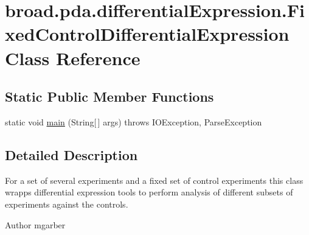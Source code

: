 \hypertarget{classbroad_1_1pda_1_1differential_expression_1_1_fixed_control_differential_expression}{\section{broad.\+pda.\+differential\+Expression.\+Fixed\+Control\+Differential\+Expression Class Reference}
\label{classbroad_1_1pda_1_1differential_expression_1_1_fixed_control_differential_expression}
}
\subsection*{Static Public Member Functions}
\begin{DoxyCompactItemize}
\item 
static void \hyperlink{classbroad_1_1pda_1_1differential_expression_1_1_fixed_control_differential_expression_a0a0018ae22cc989bf1a34659700ffef5}{main} (String\mbox{[}$\,$\mbox{]} args)  throws I\+O\+Exception, Parse\+Exception 
\end{DoxyCompactItemize}


\subsection{Detailed Description}
For a set of several experiments and a fixed set of control experiments this class wrapps differential expression tools to perform analysis of different subsets of experiments against the controls. \begin{DoxyAuthor}{Author}
mgarber 
\end{DoxyAuthor}



